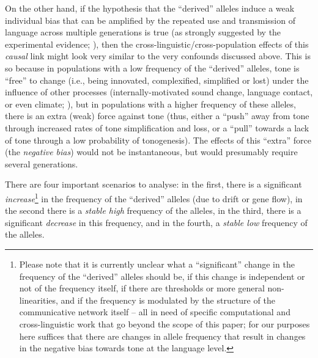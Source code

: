 \documentclass[twoside,twocolumn]{article}
\begin{document}
On the other hand, if the hypothesis that the ``derived'' alleles induce a weak individual bias that can be amplified by the repeated use and transmission of language across multiple generations \citep{dediu_ladd_2007,dediu_humbiol_2011,ladd_bioling_2008} is true (as strongly suggested by the experimental evidence; \citealp{wong_plosone_2012,wong_sciadv_2020}), then the cross-linguistic/cross-population effects of this \emph{causal} link might look very similar to the very confounds discussed above.
This is so because in populations with a low frequency of the ``derived'' alleles, tone is ``free'' to change (i.e., being innovated, complexified, simplified or lost) under the influence of other processes (internally-motivated sound change, language contact, or even climate; \citealp{yip_tone_2002,hombert_tone_1979,everett_language_2016}), but in populations with a higher frequency of these alleles, there is an extra (weak) force against tone (thus, either a ``push'' away from tone through increased rates of tone simplification and loss, or a ``pull'' towards a lack of tone through a low probability of tonogenesis).
The effects of this ``extra'' force (the \emph{negative bias}) would not be instantaneous, but would presumably require several generations.

There are four important scenarios to analyse: in the first, there is a significant \emph{increase}\footnote{Please note that it is currently unclear what a ``significant'' change in the frequency of the ``derived'' alleles should be, if this change is independent or not of the frequency itself, if there are thresholds or more general non-linearities, and if the frequency is modulated by the structure of the communicative network itself \citep{dediu_jtb_2008,dediu_jtb_2009,josserand_frontiers_2020} -- all in need of specific computational and cross-linguistic work that go beyond the scope of this paper; for our purposes here suffices that there are changes in allele frequency that result in changes in the negative bias towards tone at the language level.} in the frequency of the ``derived'' alleles (due to drift or gene flow), in the second there is a \emph{stable high} frequency of the alleles, in the third, there is a significant \emph{decrease} in this frequency, and in the fourth, a \emph{stable low} frequency of the alleles.
\end{document}
